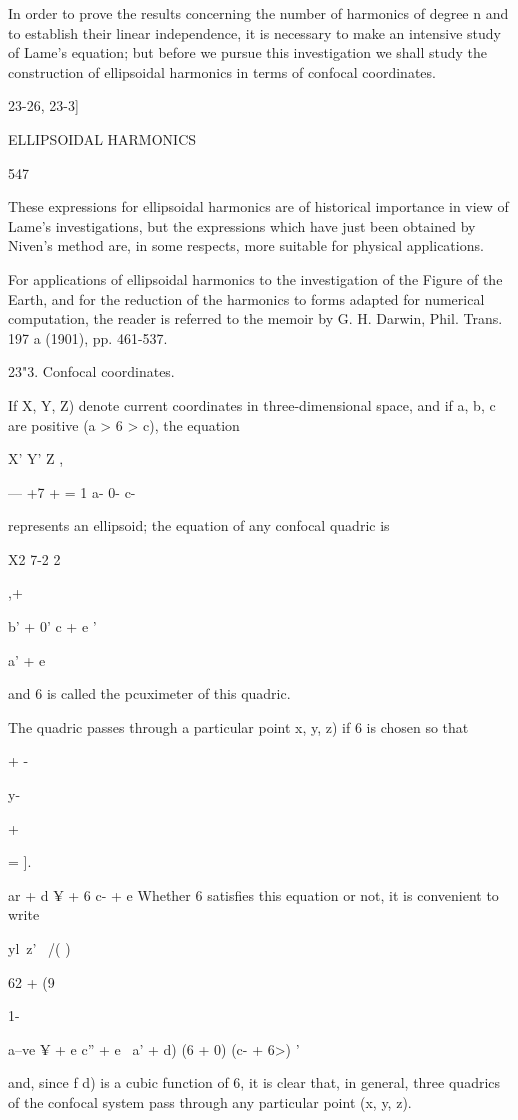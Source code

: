 {{In order to prove the results concerning the number of harmonics of
degree n and to establish their linear independence, it is necessary
to make an intensive study of Lame's equation; but before we pursue
this investigation we shall study the construction of ellipsoidal
harmonics in terms of confocal coordinates.

23-26, 23-3]

ELLIPSOIDAL HARMONICS

547

These expressions for ellipsoidal harmonics are of historical
importance in view of Lame's investigations, but the expressions which
have just been obtained by Niven's method are, in some respects, more
suitable for physical applications.

For applications of ellipsoidal harmonics to the investigation of the
Figure of the Earth, and for the reduction of the harmonics to forms
adapted for numerical computation, the reader is referred to the
memoir by G. H. Darwin, Phil. Trans. 197 a (1901), pp. 461-537.

23"3. Confocal coordinates.

If X, Y, Z) denote current coordinates in three-dimensional space, and
if a, b, c are positive (a > 6 > c), the equation

X' Y' Z ,

— +7 + = 1 a- 0- c-

represents an ellipsoid; the equation of any confocal quadric is

X2 7-2 2

,+

b' + 0' c + e '

a' + e

and 6 is called the pcuximeter of this quadric.

The quadric passes through a particular point x, y, z) if 6 is chosen
so that

+ -

y-

+

= ].

ar + d ¥ + 6 c- + e Whether 6 satisfies this equation or not, it is
convenient to write

  yl\ z' \ /( )

62 + (9

1-

a--ve ¥ + e c'' + e~ a' + d) (6 + 0) (c- + 6>) '

and, since f d) is a cubic function of 6, it is clear that, in
general, three quadrics of the confocal system pass through any
particular point (x, y, z).

}}
